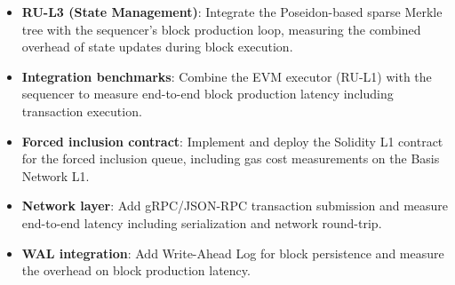 \begin{itemize}
  \item \textbf{RU-L3 (State Management)}: Integrate the Poseidon-based sparse Merkle
    tree with the sequencer's block production loop, measuring the combined overhead
    of state updates during block execution.
  \item \textbf{Integration benchmarks}: Combine the EVM executor (RU-L1) with the
    sequencer to measure end-to-end block production latency including transaction
    execution.
  \item \textbf{Forced inclusion contract}: Implement and deploy the Solidity L1
    contract for the forced inclusion queue, including gas cost measurements on
    the Basis Network L1.
  \item \textbf{Network layer}: Add gRPC/JSON-RPC transaction submission and measure
    end-to-end latency including serialization and network round-trip.
  \item \textbf{WAL integration}: Add Write-Ahead Log for block persistence and
    measure the overhead on block production latency.
\end{itemize}
